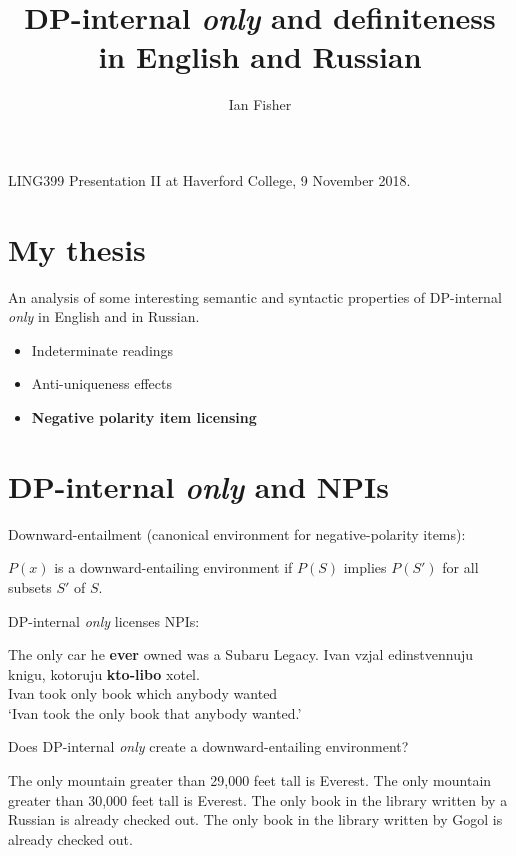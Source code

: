 \documentclass{article}
\title{DP-internal \textit{only} and definiteness in English and Russian}
\author{Ian Fisher}
\date{}
\begin{document}
\maketitle

\noindent LING399 Presentation II at Haverford College, 9 November 2018.

\section{My thesis}
An analysis of some interesting semantic and syntactic properties of DP-internal \textit{only} in English and in Russian.

\begin{itemize}
	\item Indeterminate readings
	\item Anti-uniqueness effects \citep{cb2015}
	\item \textbf{Negative polarity item licensing}
\end{itemize}

\section{DP-internal \textit{only} and NPIs}
Downward-entailment (canonical environment for negative-polarity items):

\begin{exe}
	\ex $P(x)$ is a downward-entailing environment if $P(S)$ implies $P(S')$ for all subsets $S'$ of $S$.
\end{exe}

\noindent DP-internal \textit{only} licenses NPIs:

\begin{exe}
	\ex The only car he \textbf{ever} owned was a Subaru Legacy.
	\ex \gll Ivan vzjal edinstvennuju knigu, kotoruju \textbf{kto-libo} xotel.\\
	Ivan took only book which anybody wanted\\
	\glt `Ivan took the only book that anybody wanted.'
\end{exe}

\noindent Does DP-internal \textit{only} create a downward-entailing environment?

\begin{exe}
	\ex The only mountain greater than 29,000 feet tall is Everest.
	\ex The only mountain greater than 30,000 feet tall is Everest.
	\ex The only book in the library written by a Russian is already checked out.
	\ex The only book in the library written by Gogol is already checked out.
\end{exe}


\end{document}
